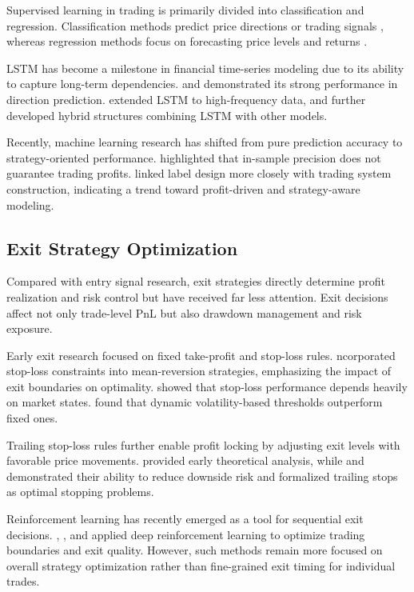 \documentclass[12pt]{article}
\begin{document}
Supervised learning in trading is primarily divided into classification and regression. Classification methods predict price directions or trading signals \citet{ShenJiangZhang2012, GerleinEtAl2016,ZhongEnke2019}, whereas regression methods focus on forecasting price levels and returns \citet{AdegboyeKampouridis2021}.

LSTM has become a milestone in financial time-series modeling due to its ability to capture long-term dependencies. \citet{NelsonPereiraDeOliveira2017} and \citet{FischerKrauss2018} demonstrated its strong performance in direction prediction. \citet{BorovkovaTsiamas2019} extended LSTM to high-frequency data, and \citet{MehtabSenDutta2020,GhoshEtAl2022} further developed hybrid structures combining LSTM with other models.

Recently, machine learning research has shifted from pure prediction accuracy to strategy-oriented performance. \citet{SebastiaoGodinho2021} highlighted that in-sample precision does not guarantee trading profits. \citet{HanKimEnke2023} linked label design more closely with trading system construction, indicating a trend toward profit-driven and strategy-aware modeling.

\subsection{Exit Strategy Optimization}

Compared with entry signal research, exit strategies directly determine profit realization and risk control but have received far less attention. Exit decisions affect not only trade-level PnL but also drawdown management and risk exposure.

Early exit research focused on fixed take-profit and stop-loss rules. \citet{LeungLi2015} ncorporated stop-loss constraints into mean-reversion strategies, emphasizing the impact of exit boundaries on optimality. \citet{LoRemorov2017} showed that stop-loss performance depends heavily on market states. \citet{VezerisKyrgosSchinas2018} found that dynamic volatility-based thresholds outperform fixed ones.

Trailing stop-loss rules further enable profit locking by adjusting exit levels with favorable price movements. \citet{GlynnIglehart1995} provided early theoretical analysis, while \citet{DaiEtAl2021} and \citet{LeungZhang2021} demonstrated their ability to reduce downside risk and formalized trailing stops as optimal stopping problems.

Reinforcement learning has recently emerged as a tool for sequential exit decisions. \citet{KimKim2019}, \citet{TsantekidisEtAl2020}, and \citet{WangEtAl2021} applied deep reinforcement learning to optimize trading boundaries and exit quality. However, such methods remain more focused on overall strategy optimization rather than fine-grained exit timing for individual trades.
\end{document}
